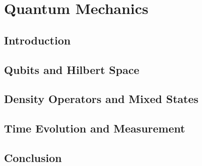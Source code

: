 \chapter{Quantum Mechanics}
\section{Introduction}
\section{Qubits and Hilbert Space}
\section{Density Operators and Mixed States}
\section{Time Evolution and Measurement}
\section{Conclusion}
